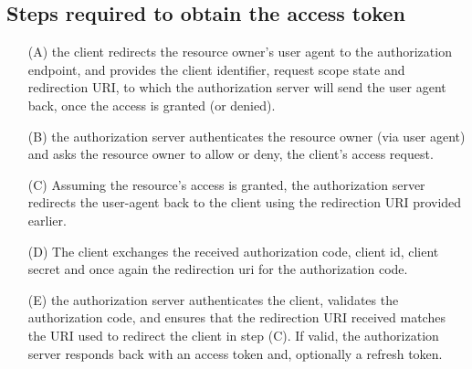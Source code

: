 \subsection{Steps required to obtain the access token}
\begin{enumerate}
    \item[(A)] the client redirects the resource owner's user agent to the
        authorization endpoint, and provides the client identifier, request
        scope state and redirection URI, to which the authorization server will
        send the user agent back, once the access is granted (or denied).
    \item[(B)] the authorization server authenticates the resource owner (via
        user agent) and asks the resource owner to allow or deny, the client's
        access request.
    \item[(C)] Assuming the resource's access is granted, the authorization
        server redirects the user-agent back to the client using the redirection
        URI provided earlier.
    \item[(D)] The client exchanges the received authorization code, client id,
        client secret and once again the redirection uri for the authorization code.

    \item[(E)] the authorization server authenticates the client, validates the
        authorization code, and ensures that the redirection URI received
        matches the URI used to redirect the client in step (C). If valid, the
        authorization server responds back with an access token and,
        optionally a refresh token.
\end{enumerate}

